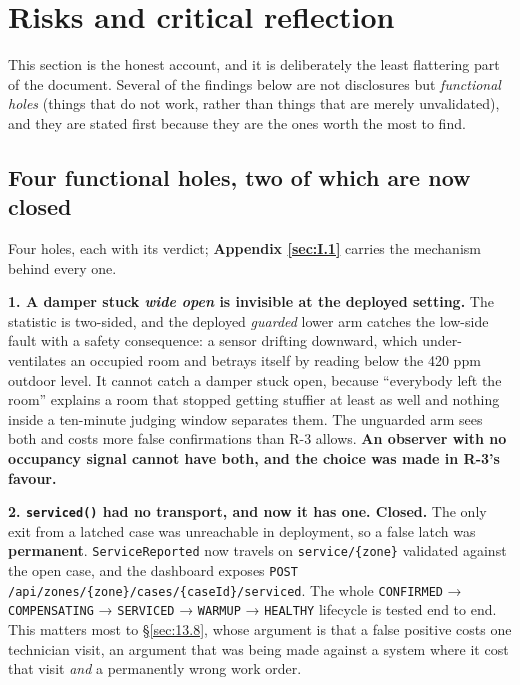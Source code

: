\section{Risks and critical reflection}\label{sec:13}

This section is the honest account, and it is deliberately the least flattering part of the
document. Several of the findings below are not disclosures but \emph{functional holes} (things
that do not work, rather than things that are merely unvalidated), and they are stated first
because they are the ones worth the most to find.

\subsection{Four functional holes, two of which are now closed}\label{sec:13.1}

Four holes, each with its verdict; \textbf{Appendix \ref{sec:I.1}} carries the mechanism behind every one.

\textbf{1. A damper stuck \emph{wide open} is invisible at the deployed setting.} The statistic is
two-sided, and the deployed \emph{guarded} lower arm catches the low-side fault with a safety
consequence: a sensor drifting downward, which under-ventilates an occupied room and betrays
itself by reading below the 420 ppm outdoor level. It cannot catch a damper stuck open, because
``everybody left the room'' explains a room that stopped getting stuffier at least as well and
nothing inside a ten-minute judging window separates them. The unguarded arm sees both and costs more
false confirmations than R-3 allows. \textbf{An observer with no occupancy signal cannot have both,
and the choice was made in R-3's favour.}

\textbf{2. \texttt{serviced()} had no transport, and now it has one. Closed.} The only exit from a
latched case was unreachable in deployment, so a false latch was \textbf{permanent}.
\texttt{ServiceReported} now travels on \texttt{service/\{zone\}} validated against the open case,
and the dashboard exposes
\texttt{POST /api/zones/\allowbreak \{zone\}/cases/\allowbreak \{caseId\}/serviced}. The whole
\texttt{CONFIRMED} → \texttt{COMPENSATING} → \texttt{SERVICED} → \texttt{WARMUP} →
\texttt{HEALTHY} lifecycle is tested end to end. This matters most to §\ref{sec:13.8}, whose argument is that a false positive
costs one technician visit, an argument that was being made against a system where it cost that
visit \emph{and} a permanently wrong work order.

